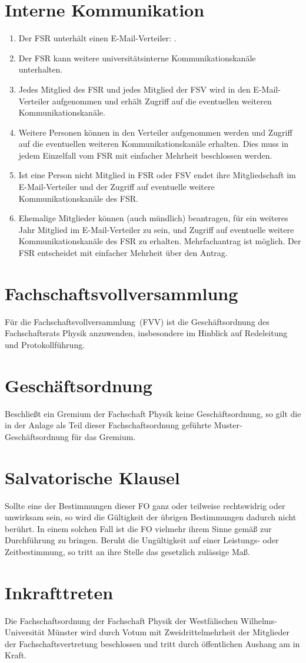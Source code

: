 \section{Interne Kommunikation}
\begin{enumerate}
	\item Der FSR unterhält einen E-Mail-Verteiler: .
	\item Der FSR kann weitere universitätsinterne Kommunikationskanäle unterhalten.
	\item Jedes Mitglied des FSR und jedes Mitglied der FSV wird in den E-Mail-Verteiler aufgenommen und erhält Zugriff auf die eventuellen weiteren Kommunikationskanäle.
	\item Weitere Personen können in den Verteiler aufgenommen werden und Zugriff auf die eventuellen weiteren Kommunikationskanäle erhalten. Dies muss in jedem Einzelfall vom FSR mit einfacher Mehrheit beschlossen werden.
	\item Ist eine Person nicht Mitglied in FSR oder FSV endet ihre Mitgliedschaft im E-Mail-Verteiler und der Zugriff auf eventuelle weitere Kommunikationskanäle des FSR.
	\item Ehemalige Mitglieder können (auch mündlich) beantragen, für ein weiteres Jahr Mitglied im E-Mail-Verteiler zu sein, und Zugriff auf eventuelle weitere Kommunikationskanäle des FSR zu erhalten.
		Mehrfachantrag ist möglich.
		Der FSR entscheidet mit einfacher Mehrheit über den Antrag.
\end{enumerate}

\section{Fachschaftsvollversammlung}
Für die Fachschaftsvollversammlung~(FVV) ist die Geschäftsordnung des Fachschaftsrats Physik anzuwenden, insbesondere im Hinblick auf Redeleitung und Protokollführung.

\section{Geschäftsordnung}
Beschließt ein Gremium der Fachschaft Physik keine Geschäftsordnung, so gilt die in der Anlage als Teil dieser Fachschaftsordnung geführte Muster-Geschäftsordnung für das Gremium.

\section{Salvatorische Klausel}
Sollte eine der Bestimmungen dieser FO ganz oder teilweise rechtswidrig oder unwirksam sein, so wird die Gültigkeit der übrigen Bestimmungen dadurch nicht berührt. In einem solchen Fall ist die FO vielmehr ihrem Sinne gemäß zur Durchführung zu bringen. Beruht die Ungültigkeit auf einer Leistungs- oder Zeitbestimmung, so tritt an ihre Stelle das gesetzlich zulässige Maß.

\section{Inkrafttreten}
Die Fachschaftsordnung der Fachschaft Physik der Westfälischen Wilhelms-Universität Münster wird durch Votum mit Zweidrittelmehrheit der Mitglieder der Fachschaftsvertretung beschlossen und tritt durch öffentlichen Aushang am  in Kraft.


